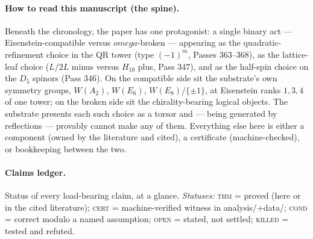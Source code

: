 \documentclass[12pt,a4paper]{article}
\def\textbf#1{#1}%
\def\texttt#1{#1}%
\def\omega{omega}%
\theoremstyle{definition}
\begin{document}
\paragraph{How to read this manuscript (the spine).}
Beneath the chronology, the paper has one protagonist: a single binary act ---
\textbf{Eisenstein-compatible versus $\omega$-broken} --- appearing as the
quadratic-refinement choice in the QR tower (type $(-1)^m$, Passes 363--368),
as the lattice-leaf choice ($L/2L$ minus versus $H_{10}$ plus, Pass 347), and
as the half-spin choice on the $D_5$ spinors (Pass 346).  On the compatible
side sit the substrate's own symmetry groups, $W(A_2)$, $W(E_6)$,
$W(E_8)/\{\pm1\}$, at Eisenstein ranks $1,3,4$ of one tower; on the broken side
sit the chirality-bearing logical objects.  The substrate presents each such
choice as a torsor and --- being generated by reflections --- provably cannot
make any of them.  Everything else here is either a component (owned by the
literature and cited), a certificate (machine-checked), or bookkeeping between
the two.

\paragraph{Claims ledger.}
Status of every load-bearing claim, at a glance.  \emph{Statuses:}
\textsc{thm} = proved (here or in the cited literature); \textsc{cert} =
machine-verified witness in \texttt{analysis/}$+$\texttt{data/}; \textsc{cond}
= correct modulo a named assumption; \textsc{open} = stated, not settled;
\textsc{killed} = tested and refuted.
\end{document}
